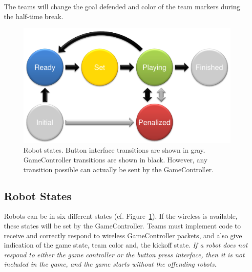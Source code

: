 \documentclass[12pt]{article}
\newcommand{\cf}{\mbox{cf.}\xspace}
\begin{document}
The teams will change the goal defended and color of the team markers during the half-time break.

\begin{figure}[t]
\centerline{\includegraphics[width=0.9\columnwidth]{figs/states.pdf}}
\caption{Robot states. Button interface transitions are shown in gray. GameController transitions are shown in black. However, any transition possible can actually be sent by the GameController.}
\label{fig:robot_states}
\end{figure}

\subsection{Robot States}
\label{sec:robot_states}

Robots can be in six different states (\cf Figure~\ref{fig:robot_states}). If the wireless is available, these states will be set by the GameController. Teams must implement code to receive and correctly respond to wireless GameController packets, and also give indication of the game state, team color and, the kickoff state.
\emph{If a robot does not respond to either the game controller or the button press interface, then it is not included in the game, and the game starts without the offending robots.}
\end{document}
